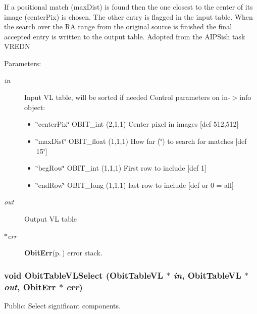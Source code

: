 If a positional match (max\-Dist) is found then the one closest to the center of its image (center\-Pix) is chosen. The other entry is flagged in the input table. When the search over the RA range from the original source is finished the final accepted entry is written to the output table. Adopted from the AIPSish task VREDN \begin{Desc}
\item[Parameters:]
\begin{description}
\item[{\em in}]Input VL table, will be sorted if needed Control parameters on in-$>$info object: \begin{itemize}
\item \char`\"{}center\-Pix\char`\"{} OBIT\_\-int (2,1,1) Center pixel in images [def 512,512] \item \char`\"{}max\-Dist\char`\"{} OBIT\_\-float (1,1,1) How far (\char`\"{}) to search for matches [def 15\char`\"{}] \item \char`\"{}beg\-Row\char`\"{} OBIT\_\-int (1,1,1) First row to include [def 1] \item \char`\"{}end\-Row\char`\"{} OBIT\_\-long (1,1,1) last row to include [def or 0 = all] \end{itemize}
\item[{\em out}]Output VL table \item[{\em $\ast$err}]{\bf Obit\-Err}{\rm (p.\,\pageref{structObitErr})} error stack. \end{description}
\end{Desc}
\subsubsection{\setlength{\rightskip}{0pt plus 5cm}void Obit\-Table\-VLSelect ({\bf Obit\-Table\-VL} $\ast$ {\em in}, {\bf Obit\-Table\-VL} $\ast$ {\em out}, {\bf Obit\-Err} $\ast$ {\em err})}\label{ObitTableVLUtil_8c_a13}


Public: Select significant components. 

